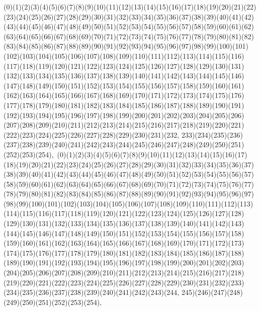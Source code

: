 \documentclass[12pt]{article}
\begin{document}
{(0)(1)(2)(3)(4)(5)(6)(7)(8)(9)(10)(11)(12)(13)(14)(15)(16)(17)(18)(19)(20)(21)(22)(23)(24)(25)(26)(27)(28)(29)(30)(31)(32)(33)(34)(35)(36)(37)(38)(39)(40)(41)(42)(43)(44)(45)(46)(47)(48)(49)(50)(51)(52)(53)(54)(55)(56)(57)(58)(59)(60)(61)(62)(63)(64)(65)(66)(67)(68)(69)(70)(71)(72)(73)(74)(75)(76)(77)(78)(79)(80)(81)(82)(83)(84)(85)(86)(87)(88)(89)(90)(91)(92)(93)(94)(95)(96)(97)(98)(99)(100)(101)(102)(103)(104)(105)(106)(107)(108)(109)(110)(111)(112)(113)(114)(115)(116)(117)(118)(119)(120)(121)(122)(123)(124)(125)(126)(127)(128)(129)(130)(131)(132)(133)(134)(135)(136)(137)(138)(139)(140)(141)(142)(143)(144)(145)(146)(147)(148)(149)(150)(151)(152)(153)(154)(155)(156)(157)(158)(159)(160)(161)(162)(163)(164)(165)(166)(167)(168)(169)(170)(171)(172)(173)(174)(175)(176)(177)(178)(179)(180)(181)(182)(183)(184)(185)(186)(187)(188)(189)(190)(191)(192)(193)(194)(195)(196)(197)(198)(199)(200)(201)(202)(203)(204)(205)(206)(207)(208)(209)(210)(211)(212)(213)(214)(215)(216)(217)(218)(219)(220)(221)(222)(223)(224)(225)(226)(227)(228)(229)(230)(231)(232, 233)(234)(235)(236)(237)(238)(239)(240)(241)(242)(243)(244)(245)(246)(247)(248)(249)(250)(251)(252)(253)(254)$
, 
$
(0)(1)(2)(3)(4)(5)(6)(7)(8)(9)(10)(11)(12)(13)(14)(15)(16)(17)(18)(19)(20)(21)(22)(23)(24)(25)(26)(27)(28)(29)(30)(31)(32)(33)(34)(35)(36)(37)(38)(39)(40)(41)(42)(43)(44)(45)(46)(47)(48)(49)(50)(51)(52)(53)(54)(55)(56)(57)(58)(59)(60)(61)(62)(63)(64)(65)(66)(67)(68)(69)(70)(71)(72)(73)(74)(75)(76)(77)(78)(79)(80)(81)(82)(83)(84)(85)(86)(87)(88)(89)(90)(91)(92)(93)(94)(95)(96)(97)(98)(99)(100)(101)(102)(103)(104)(105)(106)(107)(108)(109)(110)(111)(112)(113)(114)(115)(116)(117)(118)(119)(120)(121)(122)(123)(124)(125)(126)(127)(128)(129)(130)(131)(132)(133)(134)(135)(136)(137)(138)(139)(140)(141)(142)(143)(144)(145)(146)(147)(148)(149)(150)(151)(152)(153)(154)(155)(156)(157)(158)(159)(160)(161)(162)(163)(164)(165)(166)(167)(168)(169)(170)(171)(172)(173)(174)(175)(176)(177)(178)(179)(180)(181)(182)(183)(184)(185)(186)(187)(188)(189)(190)(191)(192)(193)(194)(195)(196)(197)(198)(199)(200)(201)(202)(203)(204)(205)(206)(207)(208)(209)(210)(211)(212)(213)(214)(215)(216)(217)(218)(219)(220)(221)(222)(223)(224)(225)(226)(227)(228)(229)(230)(231)(232)(233)(234)(235)(236)(237)(238)(239)(240)(241)(242)(243)(244, 245)(246)(247)(248)(249)(250)(251)(252)(253)(254)$
, 
$
}
\end{document}
